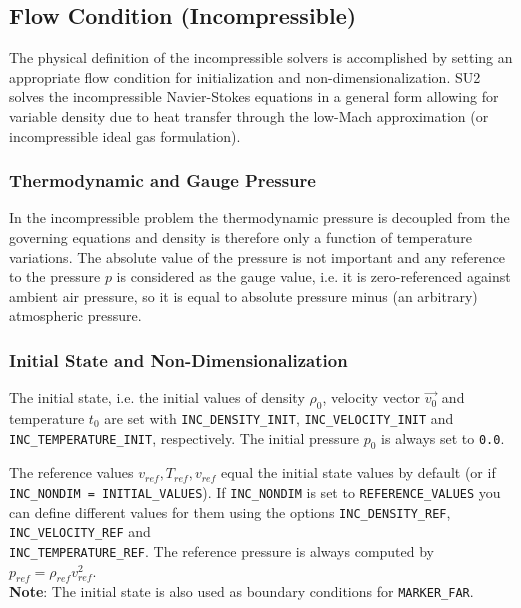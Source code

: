 \documentclass{article}
\begin{document}
\subsection{Flow Condition (Incompressible)}

The physical definition of the incompressible solvers is accomplished by setting an appropriate flow condition for initialization and non-dimensionalization. SU2 solves the incompressible Navier-Stokes equations in a general form allowing for variable density due to heat transfer through the low-Mach approximation (or incompressible ideal gas formulation).
\subsubsection{Thermodynamic and Gauge Pressure}

In the incompressible problem the thermodynamic pressure is decoupled from the governing equations and density is therefore only a function of temperature variations. The absolute value of the pressure is not important and any reference to the pressure \(p\) is considered as the gauge value, i.e. it is zero-referenced against ambient air pressure, so it is equal to absolute pressure minus (an arbitrary) atmospheric pressure.

\subsubsection{Initial State and Non-Dimensionalization}

The initial state, i.e. the initial values of density \(\rho_0\), velocity vector \(\overrightarrow{v_0}\) and temperature \(t_0\) are set with \verb|INC_DENSITY_INIT|, \verb|INC_VELOCITY_INIT| and \verb|INC_TEMPERATURE_INIT|, respectively. The initial pressure \(p_0\) is always set to \verb|0.0|.

The reference values \(v_{ref}, T_{ref}, v_{ref}\) equal the initial state values by default (or if \\ \verb|INC_NONDIM = INITIAL_VALUES|). If \verb|INC_NONDIM| is set to \verb|REFERENCE_VALUES| you can define different values for them using the options \verb|INC_DENSITY_REF|, \verb|INC_VELOCITY_REF| and \\ \verb|INC_TEMPERATURE_REF|. The reference pressure is always computed by \(p_{ref} = \rho_{ref}v_{ref}^2\).\\
\textbf{Note}: The initial state is also used as boundary conditions for \verb|MARKER_FAR|.

\newpage
\end{document}
